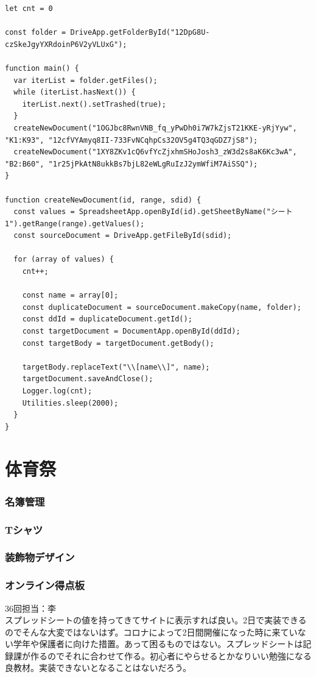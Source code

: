\documentclass[dvipdfmx,jb5]{jarticle}
\begin{document}
\begin{lstlisting}
let cnt = 0

const folder = DriveApp.getFolderById("12DpG8U-czSkeJgyYXRdoinP6V2yVLUxG");

function main() {
  var iterList = folder.getFiles();
  while (iterList.hasNext()) {
    iterList.next().setTrashed(true);
  }
  createNewDocument("1OGJbc8RwnVNB_fq_yPwDh0i7W7kZjsT21KKE-yRjYyw", "K1:K93", "12cfVYAmyq8II-733FvNCqhpCs32OV5g4TQ3qGDZ7jS8");
  createNewDocument("1XY8ZKv1cQ6vfYcZjxhmSHoJosh3_zW3d2s8aK6Kc3wA", "B2:B60", "1r25jPkAtN8ukkBs7bjL82eWLgRuIzJ2ymWfiM7AiSSQ");
}

function createNewDocument(id, range, sdid) {
  const values = SpreadsheetApp.openById(id).getSheetByName("シート1").getRange(range).getValues();
  const sourceDocument = DriveApp.getFileById(sdid);

  for (array of values) {
    cnt++;

    const name = array[0];
    const duplicateDocument = sourceDocument.makeCopy(name, folder);
    const ddId = duplicateDocument.getId();
    const targetDocument = DocumentApp.openById(ddId);
    const targetBody = targetDocument.getBody();

    targetBody.replaceText("\\[name\\]", name);
    targetDocument.saveAndClose();
    Logger.log(cnt);
    Utilities.sleep(2000);
  }
}
\end{lstlisting}

\part{体育祭}
\section{名簿管理}
\section{Tシャツ}
\section{装飾物デザイン}
\section{オンライン得点板}
36回担当：李\\

スプレッドシートの値を持ってきてサイトに表示すれば良い。2日で実装できるのでそんな大変ではないはず。コロナによって2日間開催になった時に来ていない学年や保護者に向けた措置。あって困るものではない。スプレッドシートは記録課が作るのでそれに合わせて作る。初心者にやらせるとかなりいい勉強になる良教材。実装できないとなることはないだろう。
\end{document}
